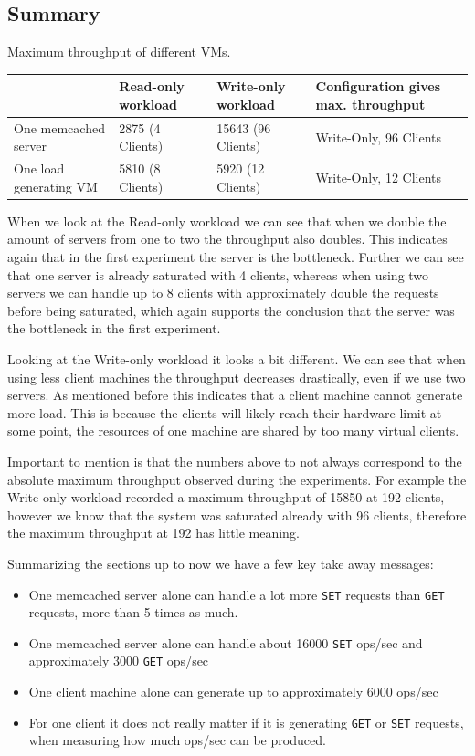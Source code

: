 \documentclass[11pt,a4paper]{article}
\begin{document}
\subsection{Summary}
%
\begin{center}
	{Maximum throughput of different VMs.}
	\begin{tabular}{|l|p{3cm}|p{3cm}|p{4cm}|}
		\hline                        & Read-only workload & Write-only workload & Configuration gives max. throughput \\ 
		\hline One memcached server   & 2875 (4 Clients)   & 15643 (96 Clients)  & Write-Only, 96 Clients       \\ 
		\hline One load generating VM & 5810 (8 Clients)  & 5920 (12 Clients)   & Write-Only, 12 Clients         \\ 
		\hline 
	\end{tabular}
\end{center}
%
When we look at the Read-only workload we can see that when we double the amount of servers from one to two the throughput also doubles. 
%
This indicates again that in the first experiment the server is the bottleneck.
%
Further we can see that one server is already saturated with 4 clients, whereas when using two servers we can handle up to 8 clients with approximately double the requests before being saturated, which again supports the conclusion that the server was the bottleneck in the first experiment.
%
\par
%
Looking at the Write-only workload it looks a bit different.
%
We can see that when using less client machines the throughput decreases drastically, even if we use two servers.
%
As mentioned before this indicates that a client machine cannot generate more load.
%
This is because the clients will likely reach their hardware limit at some point, the resources of one machine are shared by too many virtual clients.
%
\par
%
Important to mention is that the numbers above to not always correspond to the absolute maximum throughput observed during the experiments.
%
For example the Write-only workload recorded a maximum throughput of 15850 at 192 clients, however we know that the system was saturated already with 96 clients, therefore the maximum throughput at 192 has little meaning.
%
\par
%
Summarizing the sections up to now we have a few key take away messages:
%
\begin{itemize}
	\item One memcached server alone can handle a lot more \texttt{SET} requests than \texttt{GET} requests, more than 5 times as much.
	\item One memcached server alone can handle about 16000 \texttt{SET} ops/sec and approximately 3000 \texttt{GET} ops/sec
	\item One client machine alone can generate up to approximately 6000 ops/sec
	\item For one client it does not really matter if it is generating \texttt{GET} or \texttt{SET} requests, when measuring how much ops/sec can be produced.
\end{itemize}
\end{document}
